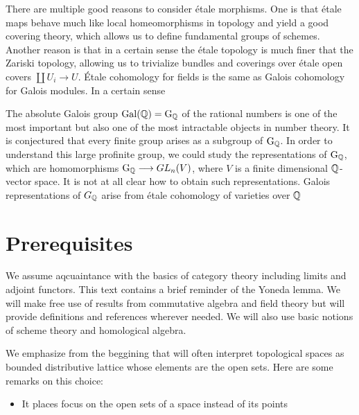 There are multiple good reasons to consider \'etale morphisms. One is that \'etale maps behave much like local homeomorphisms in topology and yield a good covering theory, which allows us to define fundamental groups of schemes. Another reason is that in a certain sense the \'etale topology is much finer that the Zariski topology, allowing us to trivialize bundles and coverings over \'etale open covers $\coprod U_i \to U$.
\'Etale cohomology for fields is the same as Galois cohomology for Galois modules. In a certain sense

The absolute Galois group $\operatorname{Gal}(\mathbb{Q}) = \operatorname{G}_{\mathbb{Q}}$ of the rational numbers is one of the most important but also one of the most intractable objects in number theory. It is conjectured that every finite group arises as a subgroup of $\operatorname{G}_{\mathbb{Q}}$. In order to understand this large profinite group, we could study the representations of $\operatorname{G}_{\mathbb{Q}}$, which are homomorphisms $\operatorname{G}_{\mathbb{Q}} \longrightarrow GL_n(V)$, where $V$ is a finite dimensional $\mathbb{Q}$-vector space. It is not at all clear how to obtain such representations. Galois representations of $G_{\mathbb{Q}}$ arise from \'etale cohomology of varieties over $\mathbb{Q}$

\section{Prerequisites}
We assume aqcuaintance with the basics of category theory including limits and adjoint functors. This text contains a brief reminder of the Yoneda lemma. We will make free use of results from commutative algebra and field theory but will provide definitions and references wherever needed. We will also use basic notions of scheme theory and homological algebra.

%
%
We emphasize from the beggining that will often interpret topological spaces as bounded distributive lattice whose elements are the open sets. Here are some remarks on this choice:
\begin{itemize}
	\item It places focus on the open sets of a space instead of its points
\end{itemize}

